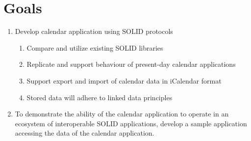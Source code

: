 \section{Goals}
\label{chap01:goals}
\begin{enumerate}[label=\color{goalcolor}\textbf{G{\arabic*}}]
    \item \label{chap01:goals:calendar}Develop calendar application using SOLID protocols
        \begin{enumerate}[label=\color{goalcolor}\textbf{\alph*})]
            \item \label{chap01:goals:calendar:SOLID} Compare and utilize existing SOLID libraries
            \item \label{chap01:goals:calendar:reqs} Replicate and support behaviour of present-day calendar applications
            \item \label{chap01:goals:calendar:iCal} Support export and import of calendar data in iCalendar format
            \item \label{chap01:goals:calendar:sharing} Stored data will adhere to linked data principles
        \end{enumerate}
    \item \label{chap01:goals:demoapp} To demonstrate the ability of the calendar application to operate in an ecosystem of interoperable SOLID applications, develop a sample application accessing the data of the calendar application.
\end{enumerate}

